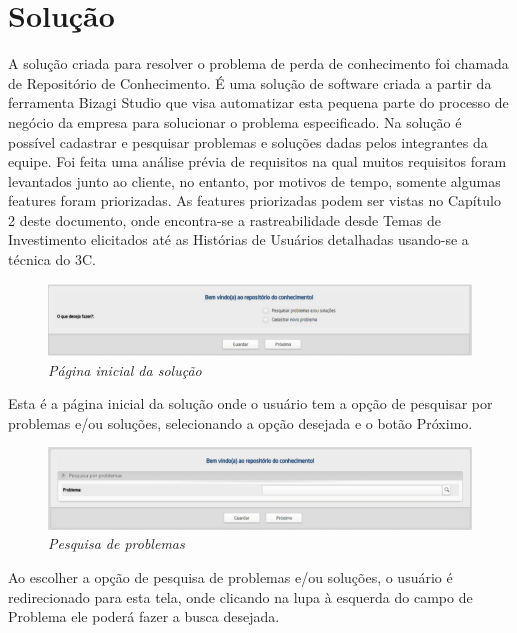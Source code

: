 \chapter[Solução]{Solução}
A solução criada para resolver o problema de perda de conhecimento foi chamada de Repositório de Conhecimento. É uma solução de software criada a partir da ferramenta Bizagi Studio que visa automatizar esta pequena parte do processo de negócio da empresa para solucionar o problema especificado. 
Na solução é possível cadastrar e pesquisar problemas e soluções dadas pelos integrantes da equipe. Foi feita uma análise prévia de requisitos na qual muitos requisitos foram levantados junto ao cliente, no entanto, por motivos de tempo, somente algumas features foram priorizadas. 
As features priorizadas podem ser vistas no Capítulo 2 deste documento, onde encontra-se a rastreabilidade desde Temas de Investimento elicitados até as Histórias de Usuários detalhadas usando-se a técnica do 3C.

\begin{figure}[H]
\centering\includegraphics[scale=0.5]{figuras/paginaInicialSolucao.png}
\caption{\textit{Página inicial da solução}}
\end{figure}

Esta é a página inicial da solução onde o usuário tem a opção de pesquisar por problemas e/ou soluções, selecionando a opção desejada e o botão Próximo.

\begin{figure}[H]
\centering\includegraphics[scale=0.5]{figuras/pesquisaDeProblemas.png}
\caption{\textit{Pesquisa de problemas}}
\end{figure}

Ao escolher a opção de pesquisa de problemas e/ou soluções, o usuário é redirecionado para esta tela, onde clicando na lupa à esquerda do campo de Problema ele poderá fazer a busca desejada. 

